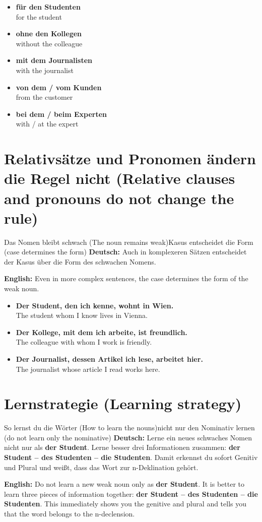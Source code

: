 \documentclass[a4paper,11pt]{article}
\newcommand{\GermanText}[1]{\textbf{Deutsch: }#1\par}
\newcommand{\EnglishText}[1]{{\small\color{SoftGray}\textbf{English: }#1\par}}
\newcommand{\ExampleItem}[2]{\item \textbf{#1}\\{\small\color{SoftGray}#2}}
\begin{document}
        \begin{exbox}
            \begin{itemize}
                \ExampleItem{für den Studenten}{for the student}
                \ExampleItem{ohne den Kollegen}{without the colleague}
                \ExampleItem{mit dem Journalisten}{with the journalist}
                \ExampleItem{von dem / vom Kunden}{from the customer}
                \ExampleItem{bei dem / beim Experten}{with / at the expert}
            \end{itemize}
        \end{exbox}

    \section{Relativsätze und Pronomen ändern die Regel nicht \textnormal{(Relative clauses and pronouns do not change the rule)}}

        \begin{grammarentry}{Das Nomen bleibt schwach \textnormal{(The noun remains weak)}}{Kasus entscheidet die Form \textnormal{(case determines the form)}}
            \GermanText{Auch in komplexeren Sätzen entscheidet der Kasus über die Form des schwachen Nomens.}
            \EnglishText{Even in more complex sentences, the case determines the form of the weak noun.}
        \end{grammarentry}

        \begin{exbox}
            \begin{itemize}
                \ExampleItem{Der Student, den ich kenne, wohnt in Wien.}{The student whom I know lives in Vienna.}
                \ExampleItem{Der Kollege, mit dem ich arbeite, ist freundlich.}{The colleague with whom I work is friendly.}
                \ExampleItem{Der Journalist, dessen Artikel ich lese, arbeitet hier.}{The journalist whose article I read works here.}
            \end{itemize}
        \end{exbox}

    \section{Lernstrategie \textnormal{(Learning strategy)}}

        \begin{grammarentry}{So lernst du die Wörter \textnormal{(How to learn the nouns)}}{nicht nur den Nominativ lernen \textnormal{(do not learn only the nominative)}}
            \GermanText{Lerne ein neues schwaches Nomen nicht nur als \textbf{der Student}. Lerne besser drei Informationen zusammen: \textbf{der Student -- des Studenten -- die Studenten}. Damit erkennst du sofort Genitiv und Plural und weißt, dass das Wort zur n-Deklination gehört.}
            \EnglishText{Do not learn a new weak noun only as \textbf{der Student}. It is better to learn three pieces of information together: \textbf{der Student -- des Studenten -- die Studenten}. This immediately shows you the genitive and plural and tells you that the word belongs to the n-declension.}
        \end{grammarentry}
\end{document}
